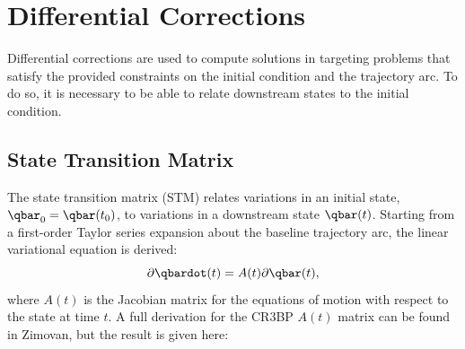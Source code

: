 \section{Differential Corrections}
Differential corrections are used to compute solutions in targeting problems that satisfy the
provided constraints on the initial condition and the trajectory arc. To do so, it is necessary to
be able to relate downstream states to the initial condition.

\subsection{State Transition Matrix}
The state transition matrix (STM) relates variations in an initial state, $\qbar_{0}=\qbar(t_{0})$,
to variations in a downstream state $\qbar(t)$. Starting from a first-order Taylor series expansion
about the baseline trajectory arc, the linear variational equation is derived:
\begin{equation}
    \partial\qbardot(t)=A(t)\partial\qbar(t),
    \label{eq:linearvariational}
\end{equation}
where $A(t)$ is the Jacobian matrix for the equations of motion with respect to the state at time
$t$. A full derivation for the CR3BP $A(t)$ matrix can be found in Zimovan, but the result is given
here\cite{Zimovan:2017}:
